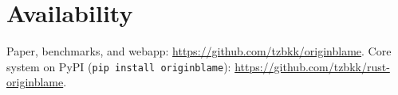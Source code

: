 \section{Availability}

Paper, benchmarks, and webapp: \url{https://github.com/tzbkk/originblame}. Core system on PyPI (\texttt{pip install originblame}): \url{https://github.com/tzbkk/rust-originblame}.